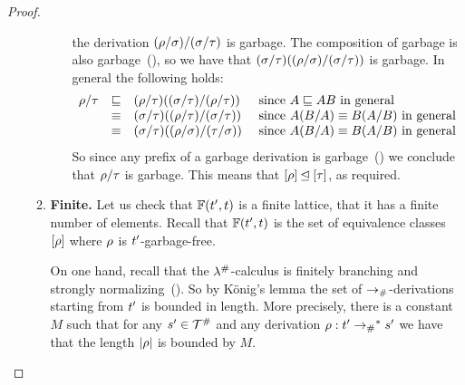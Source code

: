 \begin{proof}
\begin{enumerate}
\begin{enumerate}
\begin{enumerate}
      the derivation $(\rho/\sigma)/(\sigma/\tau)$ is garbage.
      The composition of garbage is also garbage~(),
      so we have that
      $(\sigma/\tau)((\rho/\sigma)/(\sigma/\tau))$ is garbage.
      In general the following holds:
      \[
        \begin{array}{rcll}
        \rho/\tau
        & \sqsubseteq & (\rho/\tau)((\sigma/\tau)/(\rho/\tau))    & \text{ since $A \sqsubseteq AB$ in general} \\
        & \equiv & (\sigma/\tau)((\rho/\tau)/(\sigma/\tau)) & \text{ since $A(B/A) \equiv B(A/B)$ in general} \\
        & \equiv & (\sigma/\tau)((\rho/\sigma)/(\tau/\sigma))   & \text{ since $A(B/A) \equiv B(A/B)$ in general} \\
        \end{array}
      \]
      So since any prefix of a garbage derivation is garbage~()
      we conclude that $\rho/\tau$ is garbage.
      This means that $[\rho] \unlhd [\tau]$, as required.
    \end{enumerate}
  \item {\bf Finite.}
    Let us check that $\mathbb{F}(t', t)$ is a finite lattice, \ie that it has a finite number of elements.
    Recall that $\mathbb{F}(t', t)$ is the set of equivalence classes ${[\rho]}$ where $\rho$
    is $t'$-garbage-free.

    On one hand, recall that the $\lambda^{\mathtt{\#}}$-calculus is finitely branching and strongly normalizing~().
    So by K\"onig's lemma the set of $\mathrel{\to_{\mathtt{\#}}}$-derivations starting from $t'$
    is bounded in length. More precisely, there is a constant $M$ such that
    for any $s' \in \mathcal{T}^{\mathtt{\#}}$ and any derivation $\rho : t' \mathrel{\to_{\mathtt{\#}}}^* s'$
    we have that the length $|\rho|$ is bounded by $M$.


\end{enumerate}
\end{enumerate}
\end{proof}
